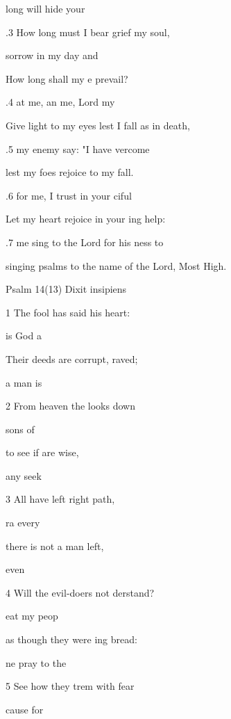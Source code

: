 long will  hide your  

.3 How long must I bear grief  my soul, 

 sorrow in my  day and  

How long shall my e prevail? 

.4  at me, an me, Lord my  

Give light to my eyes lest I fall as in death, 

.5  my enemy say: "I have vercome  

lest my foes rejoice to  my fall. 

.6  for me, I trust in your ciful  

Let my heart rejoice in your ing help: 

.7  me sing to the Lord for his ness to  

singing psalms to the name of the Lord,  Most High. 

Psalm 14(13) Dixit insipiens 


1 The fool has said  his heart: 

 is  God a 

Their deeds are corrupt, raved; 

 a  man is  

2 From heaven the  looks down 

  sons of  

to see if  are wise, 

  any seek  

3 All have left  right path, 

ra every  

there is not a  man left, 

  even  

4 Will the evil-doers not derstand? 

 eat  my peop 

as though they were ing bread: 

 ne pray to the  

5 See how they trem with fear 

 cause for  

